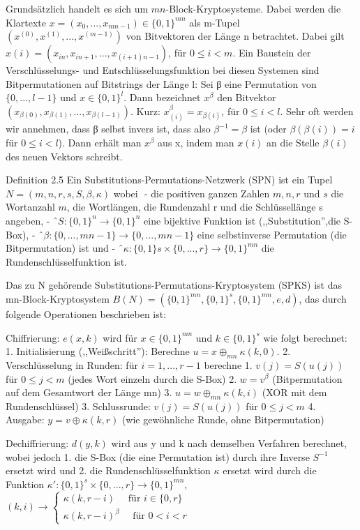 \documentclass[a4paper]{article}
\begin{document}
\begin{multicols}{3}
Grundsätzlich handelt es sich um $mn$-Block-Kryptosysteme. Dabei werden die Klartexte $x=(x_0,...,x_{mn-1})\in\{ 0,1\}^{mn}$ als m-Tupel $(x^{(0)},x^{(1)},...,x^{(m-1)})$ von Bitvektoren der Länge n betrachtet. Dabei gilt $x(i)=(x_{in},x_{in+1},...,x_{(i+1)n-1})$, für $0\leq i<m$. 
Ein Baustein der Verschlüsselungs- und Entschlüsselungsfunktion bei diesen Systemen sind Bitpermutationen  auf Bitstrings der Länge l: Sei β eine Permutation von $\{0,...,l-1\}$ und $x\in\{0,1\}^l$. Dann bezeichnet $x^β$ den Bitvektor $(x_{β(0)},x_{β(1)},...,x_{β(l-1)})$. Kurz: $x^β_{(i)}=x_{β(i)}$, für $0\leq i<l$.
Sehr oft werden wir annehmen, dass β selbst invers ist, dass also $β^{-1}=β$ ist (oder $β(β(i))=i$ für $0\leq i<l$). Dann erhält man $x^β$ aus x, indem man $x(i)$ an die Stelle $β(i)$ des neuen Vektors schreibt.

Definition 2.5 Ein Substitutions-Permutations-Netzwerk (SPN) ist ein Tupel $N=(m,n,r,s,S,\beta,\kappa)$ wobei 
- die positiven ganzen Zahlen $m,n,r$ und $s$ die Wortanzahl $m$, die Wortlängen, die Rundenzahl r und die Schlüssellänge s angeben,
- $S:\{0,1\}^n\rightarrow\{0,1\}^n$ eine bijektive Funktion ist (,,Substitution'',die S-Box),
- $β:\{0,...,mn-1\}\rightarrow\{0,...,mn-1\}$ eine selbstinverse Permutation (die Bitpermutation) ist und
- $\kappa :\{0,1\}s\times\{0,...,r\}\rightarrow\{0,1\}^{mn}$ die Rundenschlüsselfunktion ist.

Das zu N gehörende Substitutions-Permutations-Kryptosystem (SPKS) ist das mn-Block-Kryptosystem $B(N)=(\{0,1\}^{mn},\{0,1\}^s,\{0,1\}^{mn},e,d)$, das durch folgende Operationen beschrieben ist:

Chiffrierung: $e(x,k)$ wird für $x\in\{0,1\}^{mn}$ und $k\in\{0,1\}^s$ wie folgt berechnet:
1. Initialisierung (,,Weißschritt''): Berechne $u=x\oplus_{mn} \kappa (k,0)$.
2. Verschlüsselung in Runden: für $i=1,...,r-1$ berechne
    1. $v(j)=S(u(j))$ für $0\leq j<m$ (jedes Wort einzeln durch die S-Box)
    2. $w=v^β$ (Bitpermutation auf dem Gesamtwort der Länge mn)
    3. $u=w\oplus_{mn} \kappa (k,i)$ (XOR mit dem Rundenschlüssel)
3. Schlussrunde: $v(j)=S(u(j))$ für $0\leq j<m$
4. Ausgabe: $y=v\oplus \kappa (k,r)$ (wie gewöhnliche Runde, ohne Bitpermutation)

Dechiffrierung: $d(y,k)$ wird aus y und k nach demselben Verfahren berechnet, wobei jedoch
1. die S-Box (die eine Permutation ist) durch ihre Inverse $S^{-1}$ ersetzt wird und
2. die Rundenschlüsselfunktion $\kappa$ ersetzt wird durch die Funktion $\kappa′:\{0,1\}^s\times\{0,...,r\}\rightarrow\{0,1\}^{mn}$, $(k,i)\rightarrow\begin{cases} \kappa (k,r-i)\quad\text{ für } i\in\{0,r\}\\ \kappa(k,r-i)^{\beta} \quad\text{ für } 0<i<r \end{cases}$


\end{multicols}
\end{document}
